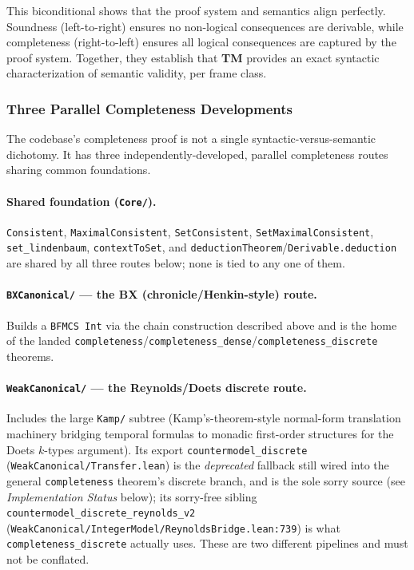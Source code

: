 \documentclass[../BimodalReference.tex]{subfiles}
\begin{document}
This biconditional shows that the proof system and semantics align perfectly.
Soundness (left-to-right) ensures no non-logical consequences are derivable, while completeness (right-to-left) ensures all logical consequences are captured by the proof system.
Together, they establish that \textbf{TM} provides an exact syntactic characterization of semantic validity, per frame class.

\subsubsection{Three Parallel Completeness Developments}

The codebase's completeness proof is not a single syntactic-versus-semantic dichotomy.
It has three independently-developed, parallel completeness routes sharing common foundations.

\paragraph{Shared foundation (\texttt{Core/}).}
\texttt{Consistent}, \texttt{MaximalConsistent}, \texttt{SetConsistent}, \texttt{SetMaximalConsistent}, \texttt{set\_lindenbaum}, \texttt{contextToSet}, and \texttt{deductionTheorem}/\texttt{Derivable.deduction} are shared by all three routes below; none is tied to any one of them.

\paragraph{\texttt{BXCanonical/} --- the BX (chronicle/Henkin-style) route.}
Builds a \texttt{BFMCS Int} via the chain construction described above and is the home of the landed \texttt{completeness}/\texttt{completeness\_dense}/\texttt{completeness\_discrete} theorems.

\paragraph{\texttt{WeakCanonical/} --- the Reynolds/Doets discrete route.}
Includes the large \texttt{Kamp/} subtree (Kamp's-theorem-style normal-form translation machinery bridging temporal formulas to monadic first-order structures for the Doets $k$-types argument).
Its export \texttt{countermodel\_discrete} (\texttt{WeakCanonical/Transfer.lean}) is the \emph{deprecated} fallback still wired into the general \texttt{completeness} theorem's discrete branch, and is the sole sorry source (see \emph{Implementation Status} below); its sorry-free sibling \texttt{countermodel\_discrete\_reynolds\_v2} (\texttt{WeakCanonical/IntegerModel/ReynoldsBridge.lean:739}) is what \texttt{completeness\_discrete} actually uses.
These are two different pipelines and must not be conflated.
\end{document}
